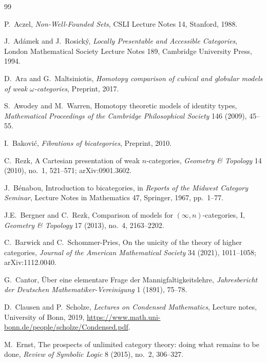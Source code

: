 \documentclass[11pt]{article}
\theoremstyle{plain}
\theoremstyle{definition}
\begin{document}
\begin{thebibliography}{99}

P.~Aczel,
\newblock \emph{Non-Well-Founded Sets},
\newblock CSLI Lecture Notes 14, Stanford, 1988.

J.~Ad\'amek and J.~Rosick\'y,
\newblock \emph{Locally Presentable and Accessible Categories},
\newblock London Mathematical Society Lecture Notes 189, Cambridge University Press, 1994.

D.~Ara and G.~Maltsiniotis,
\newblock \emph{Homotopy comparison of cubical and globular models of weak $\omega$-categories},
\newblock Preprint, 2017.

S.~Awodey and M.~Warren,
\newblock Homotopy theoretic models of identity types,
\newblock \emph{Mathematical Proceedings of the Cambridge Philosophical Society} 146 (2009), 45--55.

I.~Bakovi\'c,
\newblock \emph{Fibrations of bicategories},
\newblock Preprint, 2010.

C.~Rezk,
\newblock A Cartesian presentation of weak $n$-categories,
\newblock \emph{Geometry \& Topology} 14 (2010), no.~1, 521--571; arXiv:0901.3602.

J.~B\'enabou,
\newblock Introduction to bicategories,
\newblock in \emph{Reports of the Midwest Category Seminar}, Lecture Notes in Mathematics 47, Springer, 1967, pp.~1--77.

J.E.~Bergner and C.~Rezk,
\newblock Comparison of models for $(\infty, n)$-categories, I,
\newblock \emph{Geometry \& Topology} 17 (2013), no.~4, 2163--2202.

C.~Barwick and C.~Schommer-Pries,
\newblock On the unicity of the theory of higher categories,
\newblock \emph{Journal of the American Mathematical Society} 34 (2021), 1011--1058; arXiv:1112.0040.

G.~Cantor,
\newblock \"Uber eine elementare Frage der Mannigfaltigkeitslehre,
\newblock \emph{Jahresbericht der Deutschen Mathematiker-Vereinigung} 1 (1891), 75--78.

D.~Clausen and P.~Scholze,
\newblock \emph{Lectures on Condensed Mathematics},
\newblock Lecture notes, University of Bonn, 2019,
\newblock \url{https://www.math.uni-bonn.de/people/scholze/Condensed.pdf}.

M.~Ernst,
\newblock The prospects of unlimited category theory: doing what remains to be done,
\newblock \emph{Review of Symbolic Logic} 8 (2015), no.~2, 306--327.


\end{thebibliography}
\end{document}
